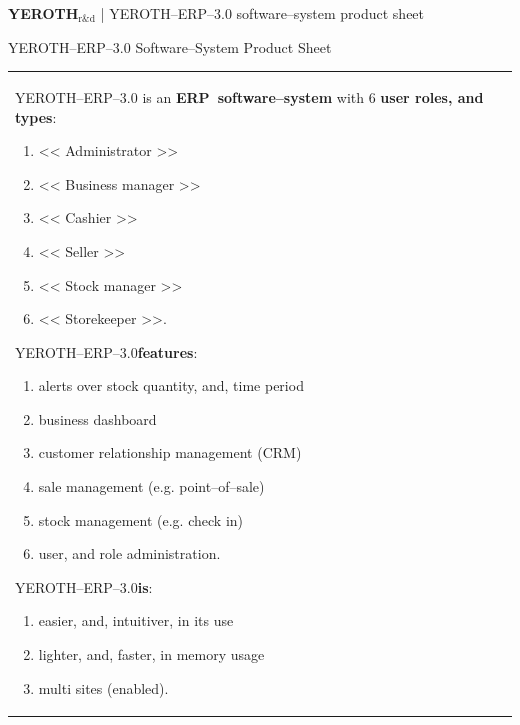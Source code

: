\documentclass[12pt, a4paper]{article}
\newcommand{\yerothrd}{\textcolor{yerothColorGreen}
			{\textsc{\textcolor{yerothColorRed}{YEROTH}}$_{\text{r\&d}}$\xspace}}
\newcommand{\yerotherpblack}{YEROTH--ERP--$3.0$\xspace}
\newcommand{\pos}{ERP~software--system\xspace}
\newcommand{\admin}{<< Administrator >>\xspace}
\newcommand{\manager}{<< Business manager >>\xspace}
\newcommand{\seller}{<< Seller >>\xspace}
\newcommand{\inventorystockmanager}{<< Stock manager >>\xspace}
\newcommand{\storekeeper}{<< Storekeeper >>\xspace}
\newcommand{\cashier}{<< Cashier >>\xspace}
\begin{document}
{\bf \Large \yerothrd} {| \sc \scriptsize \yerotherpblack software--system product sheet}


\vspace{2.5em}


\parbox{27em}{\LARGE \yerotherpblack Software--System Product Sheet}

\vspace{1.0em}

\begin{table}[!htbp]
\begin{tabular}{ll}
\parbox{27em}{

\yerotherpblack is an \textbf{\pos} with $6$ \textbf{user roles, and types}:
\vspace{0.1em}
\begin{enumerate}[1.]
	\item \admin
	\item \manager	
	\item \cashier	
	\item \seller
	\item \inventorystockmanager	
	\item \storekeeper.\\
\end{enumerate}

\yerotherpblack \textbf{features}:
\vspace{0.1em}
\begin{enumerate}[1.]
	\item alerts over stock quantity, and, time period	
	\item business dashboard
	\item customer relationship management (CRM)
	\item sale management (e.g. point--of--sale)
	\item stock management (e.g. check in)
	\item user, and role administration.\\
\end{enumerate}

\yerotherpblack \textbf{is}:
\vspace{0.1em}
\begin{enumerate}[1.]
	\item easier, and, intuitiver, in its use
	\item lighter, and, faster, in memory usage
	\item multi sites (enabled).\\
\end{enumerate}

}
\end{tabular}
\end{table}
\end{document}
